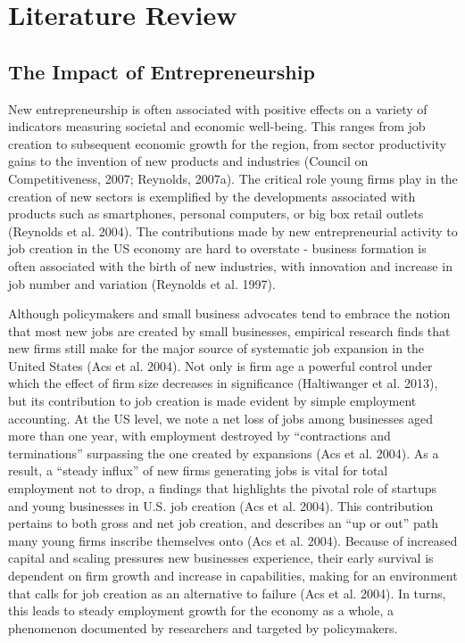 
\chapter{Literature Review\label{ch:pastwork}}

\section{The Impact of Entrepreneurship}

New entrepreneurship is often associated with positive effects on a variety of indicators measuring societal and economic well-being. This ranges from job creation to subsequent economic growth for the region, from sector productivity gains to the invention of new products and industries (Council on Competitiveness, 2007; Reynolds, 2007a). The critical role young firms play in the creation of new sectors is exemplified by the developments associated with products such as smartphones, personal computers, or big box retail outlets (Reynolds et al. 2004). The contributions made by new entrepreneurial activity to job creation in the US economy are hard to overstate - business formation is often associated with the birth of new industries, with innovation and increase in job number and variation (Reynolds et al. 1997). 

Although policymakers and small business advocates tend to embrace the notion that most new jobs are created by small businesses, empirical research finds that new firms still make for the major source of systematic job expansion in the United States (Acs et al. 2004). Not only is firm age a powerful control under which the effect of firm size decreases in significance (Haltiwanger et al. 2013), but its contribution to job creation is made evident by simple employment accounting. At the US level, we note a net loss of jobs among businesses aged more than one year, with employment destroyed by “contractions and terminations” surpassing the one created by expansions (Acs et al. 2004). As a result, a “steady influx” of new firms generating jobs is vital for total employment not to drop, a findings that highlights the pivotal role of startups and young businesses in U.S. job creation (Acs et al. 2004). This contribution pertains to both gross and net job creation, and describes an “up or out” path many young firms inscribe themselves onto (Acs et al. 2004). Because of increased capital and scaling pressures new businesses experience, their early survival is dependent on firm growth and increase in capabilities, making for an environment that calls for job creation as an alternative to failure (Acs et al. 2004). In turns, this leads to steady employment growth for the economy as a whole, a phenomenon documented by researchers and targeted by policymakers.

